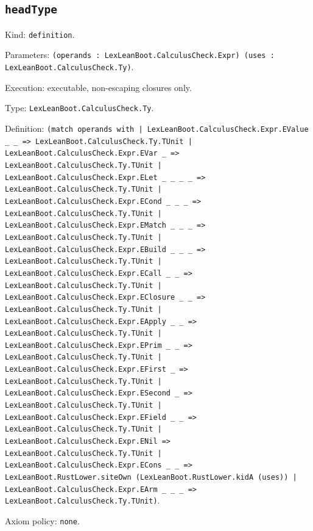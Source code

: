\documentclass[11pt]{article}
\begin{document}
\subsection*{\texttt{headType}}
\noindent Kind: \texttt{definition}.\par
\noindent Parameters: \texttt{(operands : LexLeanBoot.CalculusCheck.Expr) (uses : LexLeanBoot.CalculusCheck.Ty)}.\par
\noindent Execution: executable, non-escaping closures only.\par
\noindent Type: \texttt{LexLeanBoot.CalculusCheck.Ty}.\par
\noindent Definition: \texttt{(match operands with | LexLeanBoot.CalculusCheck.Expr.EValue \_ \_ => LexLeanBoot.CalculusCheck.Ty.TUnit | LexLeanBoot.CalculusCheck.Expr.EVar \_ => LexLeanBoot.CalculusCheck.Ty.TUnit | LexLeanBoot.CalculusCheck.Expr.ELet \_ \_ \_ \_ => LexLeanBoot.CalculusCheck.Ty.TUnit | LexLeanBoot.CalculusCheck.Expr.ECond \_ \_ \_ => LexLeanBoot.CalculusCheck.Ty.TUnit | LexLeanBoot.CalculusCheck.Expr.EMatch \_ \_ \_ => LexLeanBoot.CalculusCheck.Ty.TUnit | LexLeanBoot.CalculusCheck.Expr.EBuild \_ \_ \_ => LexLeanBoot.CalculusCheck.Ty.TUnit | LexLeanBoot.CalculusCheck.Expr.ECall \_ \_ => LexLeanBoot.CalculusCheck.Ty.TUnit | LexLeanBoot.CalculusCheck.Expr.EClosure \_ \_ => LexLeanBoot.CalculusCheck.Ty.TUnit | LexLeanBoot.CalculusCheck.Expr.EApply \_ \_ => LexLeanBoot.CalculusCheck.Ty.TUnit | LexLeanBoot.CalculusCheck.Expr.EPrim \_ \_ => LexLeanBoot.CalculusCheck.Ty.TUnit | LexLeanBoot.CalculusCheck.Expr.EFirst \_ => LexLeanBoot.CalculusCheck.Ty.TUnit | LexLeanBoot.CalculusCheck.Expr.ESecond \_ => LexLeanBoot.CalculusCheck.Ty.TUnit | LexLeanBoot.CalculusCheck.Expr.EField \_ \_ => LexLeanBoot.CalculusCheck.Ty.TUnit | LexLeanBoot.CalculusCheck.Expr.ENil => LexLeanBoot.CalculusCheck.Ty.TUnit | LexLeanBoot.CalculusCheck.Expr.ECons \_ \_ => LexLeanBoot.RustLower.siteOwn (LexLeanBoot.RustLower.kidA (uses)) | LexLeanBoot.CalculusCheck.Expr.EArm \_ \_ \_ => LexLeanBoot.CalculusCheck.Ty.TUnit)}.\par
\noindent Axiom policy: \texttt{none}.\par
\end{document}
